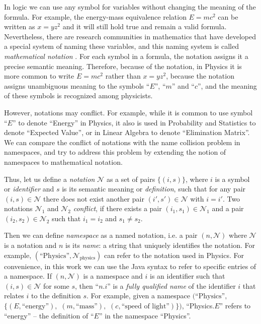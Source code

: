 In logic we can use any symbol for variables without changing the meaning of the formula.
For example, the energy-mass equivalence relation $E = mc^2$ can be written
as $x = y z^2$ and it will still hold true and remain a valid formula.
Nevertheless, there are research communities in mathematics that have developed
a special system of naming these variables, and this naming system is
called \emph{mathematical notation} \cite{wikinotation}. %
For each symbol in a formula, the notation assigns it a precise semantic
meaning. Therefore, because of the notation, in Physics it is more common
to write $E = mc^2$ rather than $x = y z^2$, because the notation assigns
unambiguous meaning to the symbols ``$E$'', ``$m$'' and ``$c$'', and the
meaning of these symbols is recognized among physicists.

However, notations may conflict. For example, while it is common to use
symbol ``$E$'' to denote ``Energy'' in Physics, it also is used in Probability and
Statistics to denote ``Expected Value'', or in Linear Algebra to denote
``Elimination Matrix''.
We can compare the conflict of notations with the name collision problem
in namespaces, and try to address this problem by extending the notion of
namespaces to mathematical notation.

Thus, let us define a \emph{notation} $\mathcal N$ as a set of pairs $\{ (i, s) \}$,
where $i$ is a symbol or \emph{identifier} and $s$ is its semantic meaning
or \emph{definition}, such that for any pair $(i, s) \in \mathcal N$ there
does not exist another pair $(i', s') \in \mathcal N$ with $i = i'$.
Two notations $\mathcal N_1$ and $\mathcal N_2$
\emph{conflict}, if there exists a pair $(i_1, s_1) \in \mathcal N_1$ and a pair
$(i_2, s_2) \in \mathcal N_2$ such that $i_1 = i_2$ and $s_1 \ne s_2$.

Then we can define \emph{namespace} as a named notation, i.e. a pair
$(n, \mathcal N)$ where $\mathcal N$ is a notation and $n$ is its \emph{name}:
a string that uniquely identifies the notation. For example,
$(\text{``Physics''}, \mathcal N_\text{physics})$ can refer to the notation
used in Physics.
For convenience, in this work we can use the Java syntax to refer to
specific entries of a namespace. If $(n, \mathcal N)$ is a namespace and $i$
is an identifier such that $(i, s) \in \mathcal N$ for some $s$, then
``$n$.$i$'' is a \emph{fully qualified name} of the identifier $i$ that
relates $i$ to the definition $s$. For example,
given a namespace $\big( \text{``Physics''},$ $\{ (E, \text{``energy''}),$
$(m, \text{``mass''}),$ $(c, \text{``speed of light''}) \} \big)$,
``Physics.$E$'' refers to ``energy'' -- the definition of ``$E$'' in the
namespace ``Physics''.

